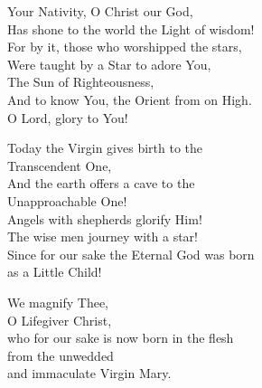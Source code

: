 \documentclass{article}
\begin{document}
%
%
Your Nativity, O Christ our God,\\
Has shone to the world the Light of wisdom!\\
For by it, those who worshipped the stars,\\
Were taught by a Star to adore You,\\
The Sun of Righteousness,\\
And to know You, the Orient from on High.\\
O Lord, glory to You!

%
Today the Virgin gives birth to the \\
    \cont Transcendent One,\\
And the earth offers a cave to the \\
    \cont Unapproachable One!\\
Angels with shepherds glorify Him!\\
The wise men journey with a star!\\
Since for our sake the Eternal God was born\\
as a Little Child!

%
We magnify Thee, \\
O Lifegiver Christ, \\
who for our sake is now born in the flesh\\
from the unwedded\\
and immaculate Virgin Mary.
\end{document}
